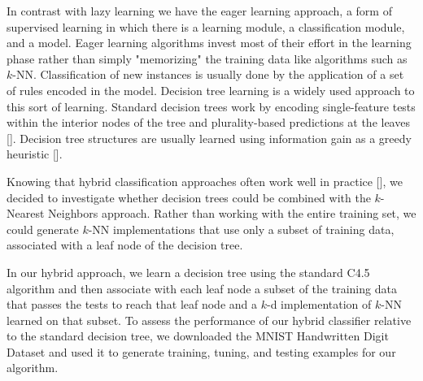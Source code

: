In contrast with lazy learning we have the eager learning approach, a form of supervised learning in which there is a learning module, a classification module, and a model. Eager learning algorithms invest most of their effort in the learning phase rather than simply "memorizing" the training data like algorithms such as $k$-NN. Classification of new instances is usually done by the application of a set of rules encoded in the model. Decision tree learning is a widely used approach to this sort of learning. Standard decision trees work by encoding single-feature tests within the interior nodes of the tree and plurality-based predictions at the leaves [].  Decision tree structures are usually learned using information gain as a greedy heuristic [].

Knowing that hybrid classification approaches often work well in practice [], we decided to investigate whether decision trees could be combined with the $k$-Nearest Neighbors approach.  Rather than working with the entire training set, we could generate $k$-NN implementations that use only a subset of training data, associated with a leaf node of the decision tree.

In our hybrid approach, we learn a decision tree using the standard C4.5 algorithm and then associate with each leaf node a subset of the training data that passes the tests to reach that leaf node and a $k$-d implementation of $k$-NN learned on that subset. To assess the performance of our hybrid classifier relative to the standard decision tree, we downloaded the MNIST Handwritten Digit Dataset \cite{MNISTDatabase} and used it to generate training, tuning, and testing examples for our algorithm.
